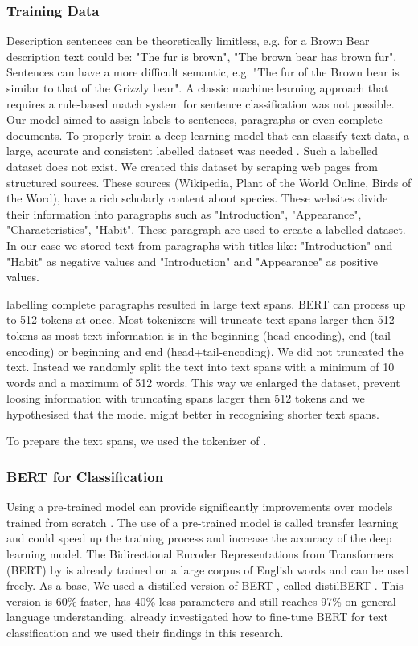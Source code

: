 \documentclass[a4paper, 12pt, oneside]{book} %
\begin{document}
\subsubsection{Training Data}
Description sentences can be theoretically limitless, e.g. for a Brown Bear description text could be: "The fur is brown", "The brown bear has brown fur".
Sentences can have a more difficult semantic, e.g. "The fur of the Brown bear is similar to that of the Grizzly bear".
A classic machine learning approach that requires a rule-based match system for sentence classification was not possible. 
Our model aimed to assign labels to sentences, paragraphs or even complete documents. 
To properly train a deep learning model that can classify text data, a large, accurate and consistent labelled dataset was needed \autocite{munappy_data_2019}.
Such a labelled dataset does not exist.
We created this dataset by scraping web pages from structured sources.
These sources (Wikipedia, Plant of the World Online, Birds of the Word), have a rich scholarly content about species.
These websites divide their information into paragraphs such as "Introduction", "Appearance", "Characteristics", "Habit".
These paragraph are used to create a labelled dataset.
In our case we stored text from paragraphs with titles like:  "Introduction" and "Habit" as negative values and "Introduction" and "Appearance" as positive values. 

labelling complete paragraphs resulted in large text spans. 
BERT can process up to 512 tokens at once.
Most tokenizers will truncate text spans larger then 512 tokens as most text information is in the beginning (head-encoding), end (tail-encoding) or beginning and end (head+tail-encoding).
We did not truncated the text.
Instead we randomly split the text into text spans with a minimum of 10 words and a maximum of 512 words.
This way we enlarged the dataset, prevent loosing information with truncating spans larger then 512 tokens and we hypothesised that the model might better in recognising shorter text spans.  


To prepare the text spans, we used the tokenizer of \autocite{wolf_huggingfaces_2020}.

\subsubsection{BERT for Classification}
Using a pre-trained model can provide significantly improvements over models trained from scratch \autocite{mikolov_distributed_2013}.
The use of a pre-trained model is called transfer learning and could speed up the training process and increase the accuracy of the deep learning model.
The Bidirectional Encoder Representations from Transformers (BERT) by \textcite{devlin_bert_2019} is already trained on a large corpus of English words and can be used freely.
As a base, We used a distilled version of BERT \autocite{devlin_bert_2019}, called distilBERT \autocite{sanh_distilbert_2020}. 
This version is 60\% faster, has 40\% less parameters and still reaches 97\% on general language understanding.
\textcite{sun_how_2020} already investigated how to fine-tune BERT for text classification and we used their findings in this research.
\end{document}
